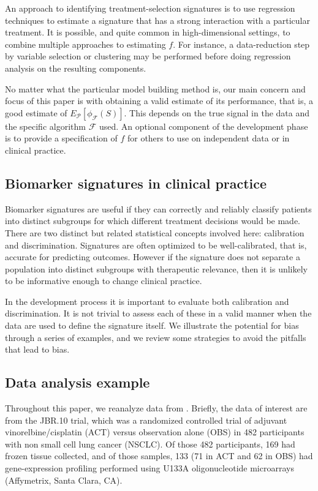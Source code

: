 \documentclass[12pt,]{article}
\begin{document}
An approach to identifying treatment-selection signatures is to use
regression techniques to estimate a signature that has a strong
interaction with a particular treatment. It is possible, and quite
common in high-dimensional settings, to combine multiple approaches to
estimating \(f\). For instance, a data-reduction step by variable
selection or clustering may be performed before doing regression
analysis on the resulting components.

No matter what the particular model building method is, our main concern
and focus of this paper is with obtaining a valid estimate of its
performance, that is, a good estimate of
\(E_\mathcal{P}[\phi_\mathcal{F}(S)]\). This depends on the true signal
in the data and the specific algorithm \(\mathcal{F}\) used. An optional
component of the development phase is to provide a specification of
\(f\) for others to use on independent data or in clinical practice.

\subsection{Biomarker signatures in clinical
practice}\label{biomarker-signatures-in-clinical-practice}

Biomarker signatures are useful if they can correctly and reliably
classify patients into distinct subgroups for which different treatment
decisions would be made. There are two distinct but related statistical
concepts involved here: calibration and discrimination. Signatures are
often optimized to be well-calibrated, that is, accurate for predicting
outcomes. However if the signature does not separate a population into
distinct subgroups with therapeutic relevance, then it is unlikely to be
informative enough to change clinical practice.

In the development process it is important to evaluate both calibration
and discrimination. It is not trivial to assess each of these in a valid
manner when the data are used to define the signature itself. We
illustrate the potential for bias through a series of examples, and we
review some strategies to avoid the pitfalls that lead to bias.

\subsection{Data analysis example}\label{data-analysis-example}

Throughout this paper, we reanalyze data from \citet{zhu2010prognostic}.
Briefly, the data of interest are from the JBR.10 trial, which was a
randomized controlled trial of adjuvant vinorelbine/cisplatin (ACT)
versus observation alone (OBS) in 482 participants with non small cell
lung cancer (NSCLC). Of those 482 participants, 169 had frozen tissue
collected, and of those samples, 133 (71 in ACT and 62 in OBS) had
gene-expression profiling performed using U133A oligonucleotide
microarrays (Affymetrix, Santa Clara, CA).
\end{document}
